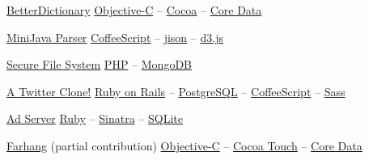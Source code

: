 \documentclass{tccv}
\begin{document}
{{\begin{project_list}
\end{project_list}

\begin{oneline_projects}

\item{\href{http://pooriaazimi.github.io/BetterDictionary/}{BetterDictionary}}
	 {%
	 	\href{https://en.wikipedia.org/wiki/Objective-C}{Objective-C} -- 
		\href{https://en.wikipedia.org/wiki/Cocoa_(API)}{Cocoa} -- 
		\href{https://en.wikipedia.org/wiki/Core_Data}{Core Data}%
	 }	

\item{\href{https://github.com/pooriaazimi/Mini-Java}{MiniJava Parser}}
	 {%
		 \href{http://coffeescript.org}{CoffeeScript} -- 
		 \href{http://zaach.github.io/jison/}{jison} -- 
		 \href{http://d3js.org}{d3.js}%
	 }

\item{\href{https://github.com/pooriaazimi/secure_file_system}{Secure File System}}
	 {%
		 \href{http://php.net}{PHP} -- 
		 \href{http://www.mongodb.org}{MongoDB}%
	 }

\item{\href{https://github.com/pooriaazimi/twitter}{A Twitter Clone!}}
	 {%
		 \href{http://rubyonrails.org}{Ruby on Rails} -- 
		 \href{http://www.postgresql.org}{PostgreSQL} -- 
		 \href{http://coffeescript.org}{CoffeeScript} -- 
		 \href{http://sass-lang.com}{Sass}%
	 }
	 

\item{\href{https://github.com/pooriaazimi/adserver}{Ad Server}}
	 {%
	 	\href{https://www.ruby-lang.org/en/}{Ruby} -- 
		\href{http://www.sinatrarb.com}{Sinatra} -- 
		\href{http://www.sqlite.org}{SQLite}%
	 }


\item{\href{http://www.turnedondigital.com/?portfolio=farhang-iphone-app}{Farhang} \large{(partial contribution)}}
	 {%
	 	\href{https://en.wikipedia.org/wiki/Objective-C}{Objective-C} -- 
		\href{https://en.wikipedia.org/wiki/Cocoa_Touch}{Cocoa Touch} -- 
		\href{https://en.wikipedia.org/wiki/Core_Data}{Core Data}%
	 }


\end{oneline_projects}








\vspace{-30pt}














}}
\end{document}
